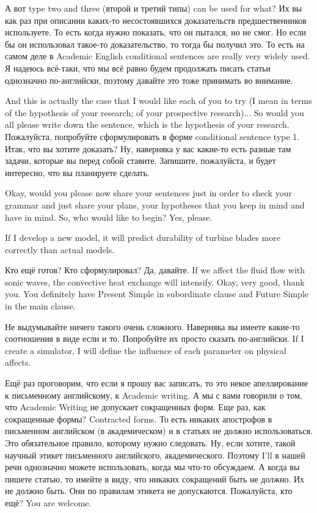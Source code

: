 \documentclass[main.tex]{subfiles}
\begin{document}
А вот type two and three (второй и третий типы) can be used for what?
Их вы как раз при описании каких-то несостоявшихся доказательств предшественников используете.
То есть когда нужно показать, что он пытался, но не смог.
Но если бы он использовал такое-то доказательство, то тогда бы получил это.
То есть на самом деле в Academic English conditional sentences are really very widely used.
Я надеюсь всё-таки, что мы всё равно будем продолжать писать статьи однозначно по-английски, поэтому давайте это тоже принимать во внимание.

\newpage
{}

And this is actually the case that I would like each of you to try (I mean in terms of the hypothesis of your research; of your prospective research)...
So would you all please write down the sentence, which is the hypothesis of your research.
Пожалуйста, попробуйте сформулировать в форме conditional sentence type 1.
Итак, что вы хотите доказать?
Ну, наверняка у вас какие-то есть разные там задачи, которые вы перед собой ставите.
Запишите, пожалуйста, и будет интересно, что вы планируете сделать.

Okay, would you please now share your sentences just in order to check your grammar and just share your plans, your hypotheses that you keep in mind and have in mind.
So, who would like to begin?
Yes, please.

If I develop a new model, it will predict durability of turbine blades more correctly than actual models.

Кто ещё готов? Кто сформулировал? Да, давайте.
If we affect the fluid flow with sonic waves, the convective heat exchange will intensify.
Okay, very good, thank you.
You definitely have Present Simple in subordinate clause and Future Simple in the main clause.

Не выдумывайте ничего такого очень сложного.
Наверняка вы имеете какие-то соотношения в виде если и то.
Попробуйте их просто сказать по-английски.
If I create a simulator, I will define the influence of each parameter on physical affects.

Ещё раз проговорим, что если я прошу вас записать, то это некое апеллирование к письменному английскому, к Academic writing.
А мы с вами говорили о том, что Academic Writing не допускает сокращенных форм.
Еще раз, как сокращенные формы?
Contracted forms.
То есть никаких апострофов в письменном английском (в академическом) и в статьях не должно использоваться.
Это обязательное правило, которому нужно следовать.
Ну, если хотите, такой научный этикет письменного английского, академического.
Поэтому I'll в нашей речи однозначно можете использовать, когда мы что-то обсуждаем.
А когда вы пишете статью, то имейте в виду, что никаких сокращений быть не должно.
Их не должно быть.
Они по правилам этикета не допускаются.
Пожалуйста, кто ещё?
You are welcome.
\end{document}
